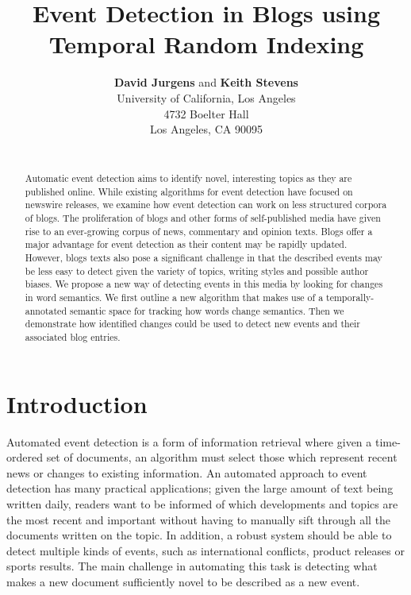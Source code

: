 \documentclass[a4paper,twocolumn,twoside,10pt]{ranlp}
\begin{document}
\title{Event Detection in Blogs using Temporal Random Indexing}


\author{ {\bf David Jurgens} and {\bf Keith Stevens} \\
University of California, Los Angeles \\
4732 Boelter Hall \\
Los Angeles, CA 90095 \\
 \\
}

\date{}

\maketitle

\thispagestyle{empty}        \pagestyle{empty}

\begin{abstract} 

Automatic event detection aims to identify novel, interesting topics as they are
published online.  While existing algorithms for event detection have focused on
newswire releases, we examine how event detection can work on less structured
corpora of blogs.
%
The proliferation of blogs and other forms of self-published media have given
rise to an ever-growing corpus of news, commentary and opinion texts.
%
Blogs offer a major advantage for event detection as their content may be
rapidly updated.  However, blogs texts also pose a significant challenge in that
the described events may be less easy to detect given the variety of topics, writing
styles and possible author biases.
%
We propose a new way of detecting events in this media by looking for changes in
word semantics.
%
We first outline a new algorithm that makes use of a temporally-annotated
semantic space for tracking how words change semantics.
%
Then we demonstrate how identified changes could be used to detect new events
and their associated blog entries.

\end{abstract}

\section {Introduction}

Automated event detection is a form of information retrieval where given a
time-ordered set of documents, an algorithm must select those which represent
recent news or changes to existing information.  An automated approach to event
detection has many practical applications; given the large amount of text being
written daily, readers want to be informed of which developments and topics are
the most recent and important without having to manually sift through all the
documents written on the topic.  In addition, a robust system should be able to
detect multiple kinds of events, such as international conflicts, product
releases or sports results.  The main challenge in automating this task is
detecting what makes a new document sufficiently novel to be described as a new
event.
\end{document}
